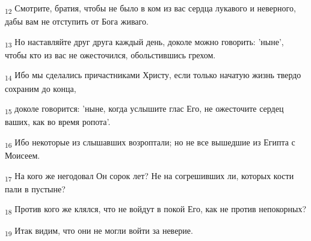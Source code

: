 \begin{tcolorbox}
\textsubscript{12} Смотрите, братия, чтобы не было в ком из вас сердца лукавого и неверного, дабы вам не отступить от Бога живаго.
\end{tcolorbox}
\begin{tcolorbox}
\textsubscript{13} Но наставляйте друг друга каждый день, доколе можно говорить: 'ныне', чтобы кто из вас не ожесточился, обольстившись грехом.
\end{tcolorbox}
\begin{tcolorbox}
\textsubscript{14} Ибо мы сделались причастниками Христу, если только начатую жизнь твердо сохраним до конца,
\end{tcolorbox}
\begin{tcolorbox}
\textsubscript{15} доколе говорится: 'ныне, когда услышите глас Его, не ожесточите сердец ваших, как во время ропота'.
\end{tcolorbox}
\begin{tcolorbox}
\textsubscript{16} Ибо некоторые из слышавших возроптали; но не все вышедшие из Египта с Моисеем.
\end{tcolorbox}
\begin{tcolorbox}
\textsubscript{17} На кого же негодовал Он сорок лет? Не на согрешивших ли, которых кости пали в пустыне?
\end{tcolorbox}
\begin{tcolorbox}
\textsubscript{18} Против кого же клялся, что не войдут в покой Его, как не против непокорных?
\end{tcolorbox}
\begin{tcolorbox}
\textsubscript{19} Итак видим, что они не могли войти за неверие.
\end{tcolorbox}
